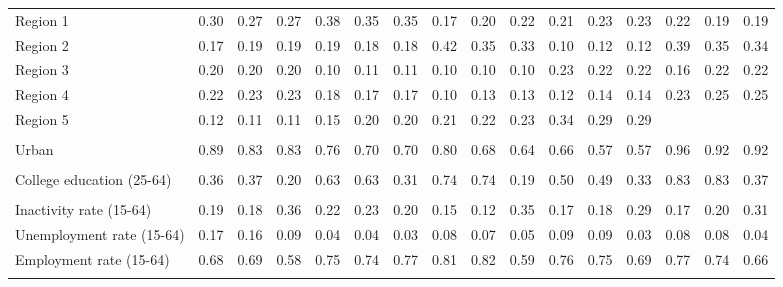 \begin{tabular}{l*{15}{c}}
\\
Region 1 & 0.30 & 0.27 & 0.27 & 0.38 & 0.35 & 0.35 & 0.17 & 0.20 & 0.22 & 0.21 & 0.23 & 0.23 & 0.22 & 0.19 & 0.19 \\
Region 2 & 0.17 & 0.19 & 0.19 & 0.19 & 0.18 & 0.18 & 0.42 & 0.35 & 0.33 & 0.10 & 0.12 & 0.12 & 0.39 & 0.35 & 0.34 \\
Region 3 & 0.20 & 0.20 & 0.20 & 0.10 & 0.11 & 0.11 & 0.10 & 0.10 & 0.10 & 0.23 & 0.22 & 0.22 & 0.16 & 0.22 & 0.22 \\
Region 4 & 0.22 & 0.23 & 0.23 & 0.18 & 0.17 & 0.17 & 0.10 & 0.13 & 0.13 & 0.12 & 0.14 & 0.14 & 0.23 & 0.25 & 0.25 \\
Region 5 & 0.12 & 0.11 & 0.11 & 0.15 & 0.20 & 0.20 & 0.21 & 0.22 & 0.23 & 0.34 & 0.29 & 0.29 & & & \\
\\
Urban & 0.89 & 0.83 & 0.83 & 0.76 & 0.70 & 0.70 & 0.80 & 0.68 & 0.64 & 0.66 & 0.57 & 0.57 & 0.96 & 0.92 & 0.92 \\
\\
College education (25-64) & 0.36 & 0.37 & 0.20 & 0.63 & 0.63 & 0.31 & 0.74 & 0.74 & 0.19 & 0.50 & 0.49 & 0.33 & 0.83 & 0.83 & 0.37 \\
\\
Inactivity rate (15-64) & 0.19 & 0.18 & 0.36 & 0.22 & 0.23 & 0.20 & 0.15 & 0.12 & 0.35 & 0.17 & 0.18 & 0.29 & 0.17 & 0.20 & 0.31 \\
Unemployment rate (15-64) & 0.17 & 0.16 & 0.09 & 0.04 & 0.04 & 0.03 & 0.08 & 0.07 & 0.05 & 0.09 & 0.09 & 0.03 & 0.08 & 0.08 & 0.04 \\
Employment rate (15-64) & 0.68 & 0.69 & 0.58 & 0.75 & 0.74 & 0.77 & 0.81 & 0.82 & 0.59 & 0.76 & 0.75 & 0.69 & 0.77 & 0.74 & 0.66 \\
\\
\bottomrule
\end{tabular}